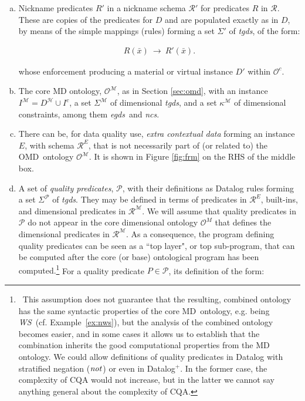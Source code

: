 \documentclass[format=acmsmall, review=false, screen=true]{acmart}
\newcommand{\mc}[1]{\mathcal{ #1}}
\newcommand{\nit}[1]{{\it #1}}
\newcommand{\schema}{\mc{R}}
\newcommand{\dplus}{{Datalog}$^+$}
\newcommand{\m}{\;\!\!}
\newcommand{\WS}{{\em W\m{}S}}
\newcommand{\omd}{OMD}
\newcommand{\md}{MD}
\newcommand{\vectt}[1]{\bar{#1}}
\newcommand{\egds}{{\em egds}}
\newcommand{\tgds}{{\em tgds}}
\newcommand{\ncs}{{\em ncs}}
\newcommand{\red}[1]{{#1}}
\newcommand{\blue}[1]{{#1}}
\newcommand{\comlb}[1]{{\vspace{2mm}\noindent \bf \blue{COMM(LEO):}}~ #1 \hfill {\bf
    END.}\\}
\newcommand{\commos}[1]{{\vspace{2mm}\noindent \bf \blue{COMM(MOSTAFA):}}~ #1 \hfill {\bf
    END.}\\}
\begin{document}
\begin{enumerate}[(a)]
  \item Nickname predicates $R'$ in a nickname schema $\schema'$ for predicates $R$ in $\schema$. These are copies of the predicates for $D$ and are populated exactly as in $D$, by means of the simple mappings (rules) forming a set  $\Sigma'$ of \tgds, of the form:



\vspace{-4mm}
\begin{align}
R(\vectt{x})~\rightarrow~R'(\vectt{x}).\label{eq:exp}
\end{align}
\vspace{-4mm}

\noindent whose enforcement producing a material or virtual instance $D'$ within $\mc{O}^c$.

  \item The core MD ontology, $\mc{O}^\mc{M}$, as in Section \ref{sec:omd},  with an instance $I^\mc{M}=D^\mc{H}\cup I^c$, a set $\Sigma^\mc{M}$ of dimensional \tgds, and a set $\kappa^\mc{M}$ of dimensional constraints, among them \egds \ and \ncs.

      \item  There can be, for data quality use, {\em extra contextual data} forming an instance $E$, with schema $\mc{R}^E$,  that is not necessarily part of (or related to)    the \omd \ ontology $\mc{O}^\mc{M}$. It is shown in Figure \ref{fig:frm} on the RHS of the middle box.




\item A set of {\em quality predicates}, $\mc{P}$, with their definitions as Datalog rules forming a set $\Sigma^\mc{P}$ of \tgds. They may be defined in terms of  predicates in $\mc{R}^E$, built-ins, and  dimensional predicates in $\mc{R}^\mc{M}$. \red{We will assume that quality predicates in $\mc{P}$ do not appear in the core dimensional ontology $\mc{O}^M$ that defines the dimensional predicates in $\mc{R}^\mc{M}$. As a consequence, the program defining quality predicates can be seen as a ``top layer", or top sub-program, that can be computed after the core (or base) ontological program has been computed.}\footnote{\  \red{This assumption does not guarantee that the resulting, combined ontology has the same syntactic properties of the core \md \ ontology, e.g. being \WS \ (cf. Example~\ref{ex:nws}), but the analysis of the combined ontology becomes easier, and in some cases it allows us to establish that the combination inherits the good computational properties from the MD ontology. We could allow definitions of quality predicates in Datalog with stratified negation ($\nit{not}$) or even in \dplus. In the former case, the complexity of CQA would not increase, but in the latter we cannot say anything general about the complexity of CQA.}} For a quality predicate $P \in \mc{P}$, its definition of the form:


\end{enumerate}
\end{document}

